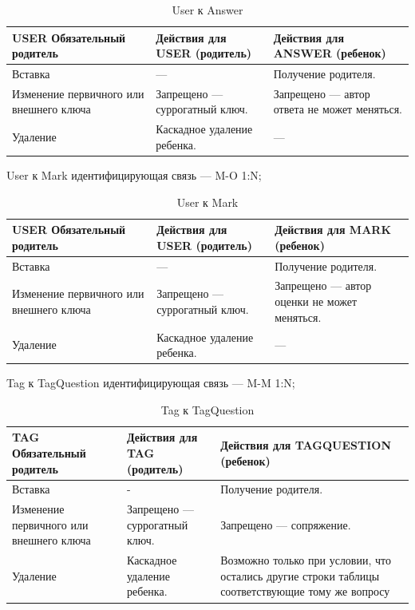 \documentclass[a4paper, 14pt]{extarticle}
\begin{document}
\begin{table}[H]
\centering
\caption{User к Answer}
\setlength\extrarowheight{2pt} %
\begin{tabular}{|>{\centering\arraybackslash}m{4cm}|>{\RaggedRight\arraybackslash}m{6cm}|>{\RaggedRight\arraybackslash}m{6cm}|}
\hline
\textbf{USER Обязательный родитель} & \textbf{Действия для USER (родитель)} & \textbf{Действия для ANSWER (ребенок)} \\
\hline
Вставка & — & Получение родителя. \\
\hline
Изменение первичного или внешнего ключа & Запрещено — суррогатный ключ. & Запрещено — автор ответа не может меняться. \\
\hline
Удаление & Каскадное удаление ребенка. & — \\
\hline
\end{tabular}
\end{table}

\newpage

User к Mark идентифицирующая связь — M-O 1:N;

\begin{table}[H]
\centering
\caption{User к Mark}
\setlength\extrarowheight{2pt} %
\begin{tabular}{|>{\centering\arraybackslash}m{4cm}|>{\RaggedRight\arraybackslash}m{6cm}|>{\RaggedRight\arraybackslash}m{6cm}|}
\hline
\textbf{USER Обязательный родитель} & \textbf{Действия для USER (родитель)} & \textbf{Действия для MARK (ребенок)} \\
\hline
Вставка & — & Получение родителя. \\
\hline
Изменение первичного или внешнего ключа & Запрещено — суррогатный ключ. & Запрещено — автор оценки не может меняться. \\
\hline
Удаление & Каскадное удаление ребенка. & — \\
\hline
\end{tabular}
\end{table}


Tag к TagQuestion идентифицирующая связь — M-M 1:N;

\begin{table}[H]
\centering
\caption{Tag к TagQuestion}
\begin{tabular}{|>{\centering\arraybackslash}m{4cm}|>{\RaggedRight}m{6cm}|>{\RaggedRight}m{6cm}|}
\hline
\textbf{TAG Обязательный родитель} & \textbf{Действия для TAG (родитель)} & \textbf{Действия для TAGQUESTION (ребенок)} \\
\hline
	Вставка & - & Получение родителя. \\
\hline
Изменение первичного или внешнего ключа & Запрещено — суррогатный ключ. & Запрещено — сопряжение. \\
\hline
Удаление & Каскадное удаление ребенка. & Возможно только при условии, что остались другие строки таблицы соответствующие тому же вопросу\\
\hline
\end{tabular}
\end{table}
\end{document}
